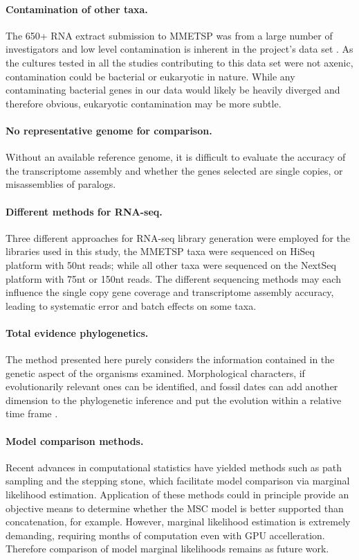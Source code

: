 \documentclass[fleqn,10pt,lineno]{wlpeerj} %
\begin{document}
\paragraph*{Contamination of other taxa.} 
The 650+ RNA extract submission to MMETSP was from a large number of investigators and low level contamination is inherent in the project's data set \citep{keeling2014marine}. 
As the cultures tested in all the studies contributing to this data set were not axenic, contamination could be bacterial or eukaryotic in nature. 
While any contaminating bacterial genes in our data would likely be heavily diverged and therefore obvious, eukaryotic contamination may be more subtle.
\paragraph*{No representative genome for comparison.} 
Without an available reference genome, it is difficult to evaluate the accuracy of the transcriptome assembly and whether the genes selected are single copies, or misassemblies of paralogs.
\paragraph*{Different methods for RNA-seq.} 
Three different approaches for RNA-seq library generation were employed for the libraries used in this study, the MMETSP taxa were sequenced on HiSeq platform with 50nt reads; while all other taxa were sequenced on the NextSeq platform with 75nt or 150nt reads. 
The different sequencing methods may each influence the single copy gene coverage and transcriptome assembly accuracy, leading to systematic error and batch effects on some taxa.
\paragraph*{Total evidence phylogenetics.}
The method presented here purely considers the information contained in the genetic aspect of the organisms examined. 
Morphological characters, if evolutionarily relevant ones can be identified, and fossil dates can add another dimension to the phylogenetic inference and put the evolution within a relative time frame \citep{gavryushkina2017bayesian}.  
\paragraph*{Model comparison methods.}
Recent advances in computational statistics have yielded methods such as path sampling and the stepping stone, which facilitate model comparison via marginal likelihood estimation. 
Application of these methods could in principle provide an objective means to determine whether the MSC model is better supported than concatenation, for example.
However, marginal likelihood estimation is extremely demanding, requiring months of computation even with GPU accelleration.
Therefore comparison of model marginal likelihoods remains as future work.
\end{document}
